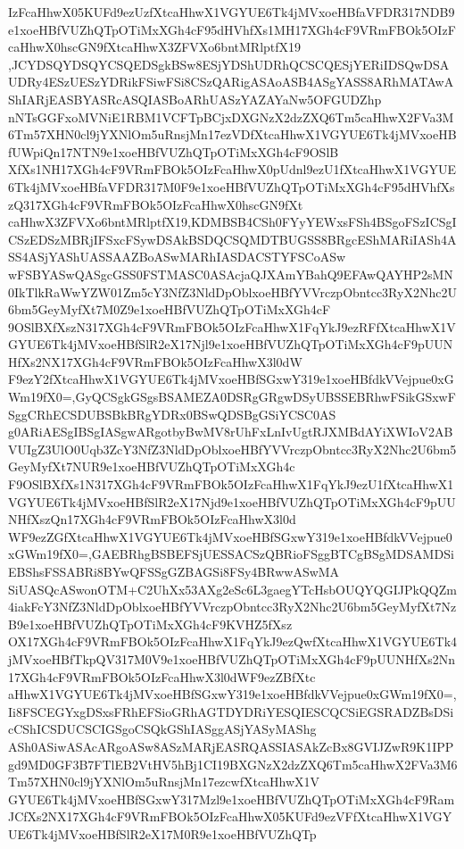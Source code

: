 \documentclass[multi=frame]{standalone}
\begin{document}
\begin{world}
        IzFcaHhwX05KUFd9ezUzfXtcaHhwX1VGYUE6Tk4jMVxoeHBfaVFDR317NDB9e1xoeHBfVUZhQTpOTiMxXGh4cF95dHVhfXs1MH17XGh4cF9VRmFBOk5OIzFcaHhwX0hscGN9fXtcaHhwX3ZFVXo6bntMRlptfX19
        ,JCYDSQYDSQYCSQEDSgkBSw8ESjYDShUDRhQCSCQESjYERiIDSQwDSAUDRy4ESzUESzYDRikFSiwFSi8CSzQARigASAoASB4ASgYASS8ARhMATAwAShIARjEASBYASRcASQIASBoARhUASzYAZAYaNw5OFGUDZhp
        nNTsGGFxoMVNiE1RBM1VCFTpBCjxDXGNzX2dzZXQ6Tm5caHhwX2FVa3M6Tm57XHN0cl9jYXNlOm5uRnsjMn17ezVDfXtcaHhwX1VGYUE6Tk4jMVxoeHBfUWpiQn17NTN9e1xoeHBfVUZhQTpOTiMxXGh4cF9OSlB
        XfXs1NH17XGh4cF9VRmFBOk5OIzFcaHhwX0pUdnl9ezU1fXtcaHhwX1VGYUE6Tk4jMVxoeHBfaVFDR317M0F9e1xoeHBfVUZhQTpOTiMxXGh4cF95dHVhfXszQ317XGh4cF9VRmFBOk5OIzFcaHhwX0hscGN9fXt
        caHhwX3ZFVXo6bntMRlptfX19,KDMBSB4CSh0FYyYEWxsFSh4BSgoFSzICSgICSzEDSzMBRjIFSxcFSywDSAkBSDQCSQMDTBUGSS8BRgcEShMARiIASh4ASS4ASjYAShUASSAAZBoASwMARhIASDACSTYFSCoASw
        wFSBYASwQASgcGSS0FSTMASC0ASAcjaQJXAmYBahQ9EFAwQAYHP2sMN0IkTlkRaWwYZW01Zm5cY3NfZ3NldDpOblxoeHBfYVVrczpObntcc3RyX2Nhc2U6bm5GeyMyfXt7M0Z9e1xoeHBfVUZhQTpOTiMxXGh4cF
        9OSlBXfXszN317XGh4cF9VRmFBOk5OIzFcaHhwX1FqYkJ9ezRFfXtcaHhwX1VGYUE6Tk4jMVxoeHBfSlR2eX17Njl9e1xoeHBfVUZhQTpOTiMxXGh4cF9pUUNHfXs2NX17XGh4cF9VRmFBOk5OIzFcaHhwX3l0dW
        F9ezY2fXtcaHhwX1VGYUE6Tk4jMVxoeHBfSGxwY319e1xoeHBfdkVVejpue0xGWm19fX0=,GyQCSgkGSgsBSAMEZA0DSRgGRgwDSyUBSSEBRhwFSikGSxwFSggCRhECSDUBSBkBRgYDRx0BSwQDSBgGSiYCSC0AS
        g0ARiAESgIBSgIASgwARgotbyBwMV8rUhFxLnIvUgtRJXMBdAYiXWIoV2ABVUIgZ3UlO0Uqb3ZcY3NfZ3NldDpOblxoeHBfYVVrczpObntcc3RyX2Nhc2U6bm5GeyMyfXt7NUR9e1xoeHBfVUZhQTpOTiMxXGh4c
        F9OSlBXfXs1N317XGh4cF9VRmFBOk5OIzFcaHhwX1FqYkJ9ezU1fXtcaHhwX1VGYUE6Tk4jMVxoeHBfSlR2eX17Njd9e1xoeHBfVUZhQTpOTiMxXGh4cF9pUUNHfXszQn17XGh4cF9VRmFBOk5OIzFcaHhwX3l0d
        WF9ezZGfXtcaHhwX1VGYUE6Tk4jMVxoeHBfSGxwY319e1xoeHBfdkVVejpue0xGWm19fX0=,GAEBRhgBSBEFSjUESSACSzQBRioFSggBTCgBSgMDSAMDSiEBShsFSSABRi8BYwQFSSgGZBAGSi8FSy4BRwwASwMA
        SiUASQcASwonOTM+C2UhXx53AXg2eSc6L3gaegYTcHsbOUQYQGIJPkQQZm4iakFcY3NfZ3NldDpOblxoeHBfYVVrczpObntcc3RyX2Nhc2U6bm5GeyMyfXt7NzB9e1xoeHBfVUZhQTpOTiMxXGh4cF9KVHZ5fXsz
        OX17XGh4cF9VRmFBOk5OIzFcaHhwX1FqYkJ9ezQwfXtcaHhwX1VGYUE6Tk4jMVxoeHBfTkpQV317M0V9e1xoeHBfVUZhQTpOTiMxXGh4cF9pUUNHfXs2Nn17XGh4cF9VRmFBOk5OIzFcaHhwX3l0dWF9ezZBfXtc
        aHhwX1VGYUE6Tk4jMVxoeHBfSGxwY319e1xoeHBfdkVVejpue0xGWm19fX0=,Ii8FSCEGYxgDSxsFRhEFSioGRhAGTDYDRiYESQIESCQCSiEGSRADZBsDSicCShICSDUCSCIGSgoCSQkGShIASggASjYASyMAShg
        ASh0ASiwASAcARgoASw8ASzMARjEASRQASSIASAkZcBx8GVIJZwR9K1IPPgd9MD0GF3B7FTlEB2VtHV5hBj1CI19BXGNzX2dzZXQ6Tm5caHhwX2FVa3M6Tm57XHN0cl9jYXNlOm5uRnsjMn17ezcwfXtcaHhwX1V
        GYUE6Tk4jMVxoeHBfSGxwY317Mzl9e1xoeHBfVUZhQTpOTiMxXGh4cF9RamJCfXs2NX17XGh4cF9VRmFBOk5OIzFcaHhwX05KUFd9ezVFfXtcaHhwX1VGYUE6Tk4jMVxoeHBfSlR2eX17M0R9e1xoeHBfVUZhQTp

\end{world}
\end{document}
